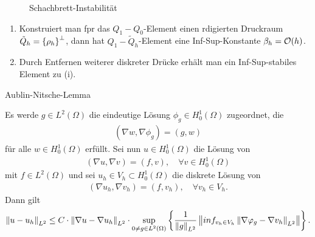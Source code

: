 \begin{beispiel}
\begin{figure}[h!]
  \caption{Schachbrett-Instabilität}
  \label{fig:schachbrett-2}
\end{figure}
\end{beispiel}
\begin{bemerkung*}
  \begin{enumerate}
  \item Konstruiert man fpr das $Q_{1}- Q_{0}$-Element einen rdigierten Druckraum $\tilde Q_{h} = \left\{ \rho_{h} \right\}^{\perp}$, dann hat $Q_{1}- \tilde Q_{h}$-Element eine Inf-Sup-Konstante $\beta_{h}= {\cal O}(h)$. 
\item Durch Entfernen weiterer diskreter Drücke erhält man ein Inf-Sup-stabiles Element zu (i). 
  \end{enumerate}
\end{bemerkung*}
\begin{lemma} Aublin-Nitsche-Lemma
  
Es werde $g \in L^{2}(\Omega)$ die eindeutige Lösung $\phi_{g} \in H_{0}^{1}(\Omega)$ zugeordnet, die
\begin{align*}
  (\nabla w, \nabla \phi_{g}) = (g, w) 
\end{align*}
für alle $w \in H_{0}^{1}(\Omega)$ erfüllt. Sei nun $u  \in H_{0}^{1}(\Omega)$ die Lösung von
\begin{align*}
(\nabla u, \nabla v) = (f, v), \quad \forall v \in H_{0}^{1}(\Omega)
\end{align*}
mit $f \in L^{2}(\Omega)$ und sei $u_{h} \in V_{h} \subset H_{0}^{1} (\Omega)$ die diskrete Lösung von 
\begin{align*}
  (\nabla u_{h}, \nabla v_{h}) = (f, v_{h}), \quad \forall v_{h} \in V_{h}.
\end{align*}
Dann gilt
\begin{align*}
  \left \|u- u_{h} \right\|_{L^{2}} \leq C \cdot \left \|\nabla u - \nabla u_{h} \right\|_{L^{2}}\cdot \sup_{0 \neq g \in L^{2}(\Omega)}\left\{ \frac 1 {\left \|g \right\|_{L^{2}}}\left \|inf_{v_{h} \in V_{h}} \left \|\nabla \varphi_{g} - \nabla v_{h} \right\|_{L^{2}} \right\| \right\}. 
\end{align*}
\end{lemma}
